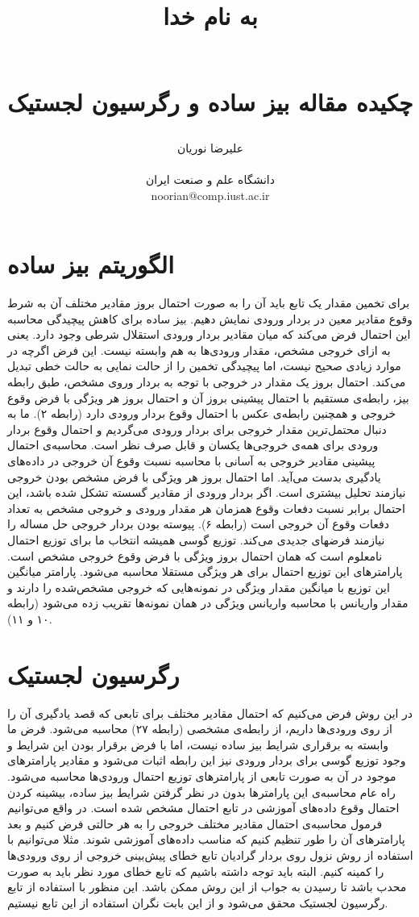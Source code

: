 \documentclass{article}
\title{ 
\begin{normalsize} به نام خدا \end{normalsize}
\\[7cm]
چکیده مقاله بیز ساده و رگرسیون لجستیک
\\[3cm]
}
\author{علیرضا نوریان
\\
\\ \small دانشگاه علم و صنعت ایران
\\ \small noorian@comp.iust.ac.ir
}
\begin{document}
\maketitle

\section{الگوریتم بیز ساده}
برای تخمین مقدار یک تابع باید آن را به صورت احتمال بروز مقادیر مختلف آن به شرط وقوع مقادیر معین در بردار ورودی نمایش دهیم. بیز ساده برای کاهش پیچیدگی محاسبه این احتمال فرض می‌کند که میان مقادیر بردار ورودی استقلال شرطی وجود دارد. یعنی به ازای خروجی مشخص، مقدار ورودی‌ها به هم وابسته نیست. این فرض اگرچه در موارد زیادی صحیح نیست، اما پیچیدگی تخمین را از حالت نمایی به حالت خطی تبدیل می‌کند.
احتمال بروز یک مقدار در خروجی با توجه به بردار وروی مشخص، طبق رابطه بیز، رابطه‌ی مستقیم با احتمال پیشینی بروز آن و احتمال بروز هر ویژگی با فرض وقوع خروجی و همچنین رابطه‌ی عکس با احتمال وقوع بردار ورودی دارد (رابطه ۲). ما به دنبال محتمل‌ترین مقدار خروجی برای بردار ورودی می‌گردیم و احتمال وقوع بردار ورودی برای همه‌ی خروجی‌ها یکسان و قابل صرف نظر است.
محاسبه‌ی احتمال پیشینی مقادیر خروجی به آسانی با محاسبه نسبت وقوع آن خروجی در داده‌های یادگیری بدست می‌آید. اما احتمال بروز هر ویژگی با فرض مشخص بودن خروجی نیازمند تحلیل بیشتری است. اگر بردار ورودی از مقادیر گسسته تشکل شده باشد، این احتمال برابر نسبت دفعات وقوع همزمان هر مقدار ورودی و خروجی مشخص به تعداد دفعات وقوع آن خروجی است (رابطه ۶).
پیوسته بودن بردار خروجی حل مساله را نیازمند فرضهای جدیدی می‌کند. توزیع گوسی همیشه انتخاب ما برای توزیع احتمال نامعلوم است که همان احتمال بروز ویژگی با فرض وقوع خروجی مشخص است. پارامترهای این توزیع احتمال برای هر ویژگی مستقلا محاسبه می‌شود. پارامتر میانگین این توزیع با میانگین مقدار ویژگی در نمونه‌هایی که خروجی مشخص‌شده را دارند و مقدار واریانس با محاسبه واریانس ویژگی در همان نمونه‌ها تقریب زده می‌شود (رابطه ۱۰  و ۱۱).

\section{رگرسیون لجستیک}
در این روش فرض می‌کنیم که احتمال مقادیر مختلف برای تابعی که قصد یادگیری آن را از روی ورودی‌ها داریم، از رابطه‌ی مشخصی (رابطه ۲۷) محاسبه می‌شود. فرض ما وابسته به برقراری شرایط بیز ساده نیست، اما با فرض برقرار بودن این شرایط و وجود توزیع گوسی برای بردار ورودی نیز این رابطه اثبات می‌شود و مقادیر پارامترهای موجود در آن به صورت تابعی از پارامترهای توزیع احتمال ورودی‌ها محاسبه می‌شود. راه عام محاسبه‌ی این پارامترها بدون در نظر گرفتن شرایط بیز ساده، بیشینه کردن احتمال وقوع داده‌های آموزشی در تابع احتمال مشخص شده است.
در واقع می‌توانیم فرمول محاسبه‌ی احتمال مقادیر مختلف خروجی را به هر حالتی فرض کنیم و بعد پارامترهای آن را طور تنظیم کنیم که مناسب داده‌های آموزشی شوند. مثلا می‌توانیم با استفاده از روش نزول روی بردار گرادیان تابع خطای پیش‌بینی خروجی از روی ورودی‌ها را کمینه کنیم. البته باید توجه داشته باشیم که تابع خطای مورد نظر باید به صورت محدب باشد تا رسیدن به جواب از این روش ممکن باشد. این منظور با استفاده از تابع رگرسیون لجستیک محقق می‌شود و از این بابت نگران استفاده از این تابع نیستیم.
\end{document}
